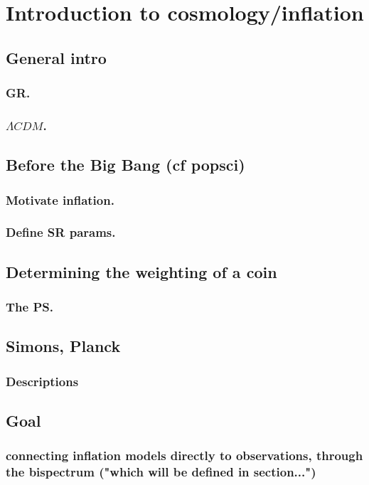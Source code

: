 %
\chapter{Introduction to cosmology/inflation}
\section{General intro}\label{sec:general_intro}
    \subsection{GR.}
    \subsection{$\Lambda CDM$.}
\section{Before the Big Bang (cf popsci)}
    \subsection{Motivate inflation.}
    \subsection{Define SR params.}
\section{Determining the weighting of a coin}
    \subsection{The PS.}
\section{Simons, Planck}
    \subsection{Descriptions}
\section{Goal}
    \subsection{connecting inflation models directly to observations, through the bispectrum ("which will be defined in section...")}
